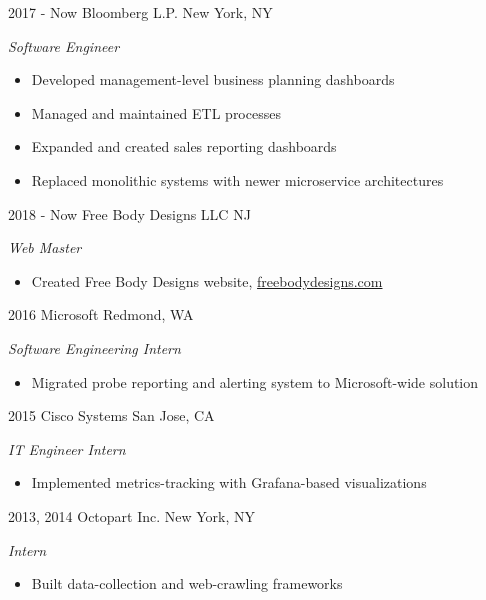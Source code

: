 \documentclass[]{friggeri-cv}
\begin{document}
\begin{entrylist}
  \entry
    {2017 - Now}
    {Bloomberg L.P.}
    {New York, NY}
    {\emph{Software Engineer}
    \begin{itemize}
        \item Developed management-level business planning dashboards
        \item Managed and maintained ETL processes
        \item Expanded and created sales reporting dashboards
        \item Replaced monolithic systems with newer microservice architectures
    \end{itemize}
    }
  \entry
    {2018 - Now}
    {Free Body Designs LLC}
    {NJ}
    {\emph{Web Master}
    \begin{itemize}
        \item Created Free Body Designs website, \href{http://freebodydesigns.com}{freebodydesigns.com}
    \end{itemize}
    }
  \entry
    {2016}
    {Microsoft}
    {Redmond, WA}
    {\emph{Software Engineering Intern}
    \begin{itemize}
        \item Migrated probe reporting and alerting system to Microsoft-wide solution
    \end{itemize}
    }
  \entry
    {2015}
    {Cisco Systems}
    {San Jose, CA}
    {\emph{IT Engineer Intern}
    \begin{itemize}
        \item Implemented metrics-tracking with Grafana-based visualizations
    \end{itemize}
    }
  \entry
    {2013, 2014}
    {Octopart Inc.}
    {New York, NY}
    {\emph{Intern}
    \begin{itemize}
        \item Built data-collection and web-crawling frameworks
    \end{itemize}
    }
\end{entrylist}
\end{document}
